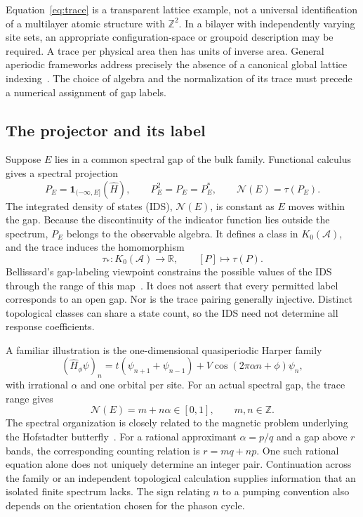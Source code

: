 \documentclass[11pt,a4paper]{article}
\newcommand{\Id}{\mathbf{1}}
\begin{document}
Equation~\eqref{eq:trace} is a transparent lattice example, not a universal identification of a multilayer atomic structure with $\mathbb Z^2$. In a bilayer with independently varying site sets, an appropriate configuration-space or groupoid description may be required. A trace per physical area then has units of inverse area. General aperiodic frameworks address precisely the absence of a canonical global lattice indexing~\cite{bourne2018}. The choice of algebra and the normalization of its trace must precede a numerical assignment of gap labels.

\subsection{The projector and its label}

Suppose $E$ lies in a common spectral gap of the bulk family. Functional calculus gives a spectral projection
\begin{equation}
 P_E=\Id_{(-\infty,E]}(\hat H),\qquad P_E^2=P_E=P_E^*,\qquad
 \mathcal N(E)=\tau(P_E).
 \label{eq:ids}
\end{equation}
The integrated density of states (IDS), $\mathcal N(E)$, is constant as $E$ moves within the gap. Because the discontinuity of the indicator function lies outside the spectrum, $P_E$ belongs to the observable algebra. It defines a class in $K_0(\mathcal A)$, and the trace induces the homomorphism
\begin{equation}
 \tau_*:K_0(\mathcal A)\longrightarrow\mathbb R,
 \qquad [P]\longmapsto\tau(P).
 \label{eq:kzero}
\end{equation}
Bellissard's gap-labeling viewpoint constrains the possible values of the IDS through the range of this map~\cite{bellissard1986,bellissard2006}. It does not assert that every permitted label corresponds to an open gap. Nor is the trace pairing generally injective. Distinct topological classes can share a state count, so the IDS need not determine all response coefficients.

A familiar illustration is the one-dimensional quasiperiodic Harper family
\begin{equation}
 (\hat H_\phi\psi)_n=t(\psi_{n+1}+\psi_{n-1})
 +V\cos(2\pi\alpha n+\phi)\psi_n,
 \label{eq:harper}
\end{equation}
with irrational $\alpha$ and one orbital per site. For an actual spectral gap, the trace range gives
\begin{equation}
 \mathcal N(E)=m+n\alpha\in[0,1],\qquad m,n\in\mathbb Z.
 \label{eq:harperlabel}
\end{equation}
The spectral organization is closely related to the magnetic problem underlying the Hofstadter butterfly~\cite{hofstadter1976}. For a rational approximant $\alpha=p/q$ and a gap above $r$ bands, the corresponding counting relation is $r=mq+np$. One such rational equation alone does not uniquely determine an integer pair. Continuation across the family or an independent topological calculation supplies information that an isolated finite spectrum lacks. The sign relating $n$ to a pumping convention also depends on the orientation chosen for the phason cycle.
\end{document}
